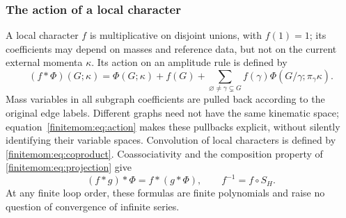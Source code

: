 \documentclass[11pt,a4paper,oneside]{article}
\theoremstyle{plain}
\theoremstyle{definition}
\theoremstyle{remark}
\numberwithin{equation}{section}
\begin{document}
\subsubsection{The action of a local character}
A local character $f$ is multiplicative on disjoint unions, with $f(1)=1$; its coefficients may depend on masses and reference data, but not on the current external momenta $\kappa$.
Its action on an amplitude rule is defined by
\begin{equation}\label{finitemom:eq:action}
 (f*\Phi)(G;\kappa)=\Phi(G;\kappa)+f(G)
   +\sum_{\varnothing\ne\gamma\subsetneq G}
        f(\gamma)\Phi(G/\gamma;\pi_\gamma\kappa).
\end{equation}
Mass variables in all subgraph coefficients are pulled back according to the original edge labels.
Different graphs need not have the same kinematic space; equation~\eqref{finitemom:eq:action} makes these pullbacks explicit, without silently identifying their variable spaces.
Convolution of local characters is defined by \eqref{finitemom:eq:coproduct}. Coassociativity and the composition property of \eqref{finitemom:eq:projection} give
\begin{equation}\label{finitemom:eq:associative}
 (f*g)*\Phi=f*(g*\Phi),\qquad f^{-1}=f\circ S_H.
\end{equation}
At any finite loop order, these formulas are finite polynomials and raise no question of convergence of infinite series.
\end{document}
